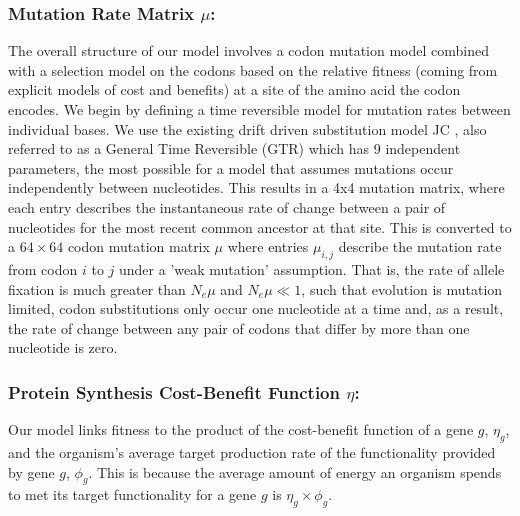 \documentclass{article}
\newcommand{\Nemu}{\ensuremath{{N_e \mu}}\xspace} %
\newcommand{\etag}{\ensuremath{\eta_g}\xspace}
\newcommand{\muij}{\ensuremath{\mu_{i,j}}\xspace}
\newcommand{\phig}{\ensuremath{\phi_{g}}\xspace}
\begin{document}
\subsubsection*{Mutation Rate Matrix $\mu$: }
The overall structure of our model involves a codon mutation model combined with a selection model on the codons based on the relative fitness (coming from explicit models of cost and benefits) at a site of the amino acid the codon encodes.
We begin by defining a time reversible model for mutation rates between individual bases.
We use the existing drift driven substitution model JC \citet{JukesAndCantor1969}, also referred to as a General Time Reversible (GTR) \citet{Tavare1986,Yang2014} which has 9 independent parameters, the most possible for a model that assumes mutations occur independently between nucleotides.
This results in a 4x4 mutation matrix, where each entry describes the instantaneous rate of change between a pair of nucleotides for the most recent common ancestor at that site.
This is converted to a $64 \times 64$ codon mutation matrix $\mu$ where entries $\muij$ describe the mutation rate from codon $i$ to $j$ under a 'weak mutation' assumption.
That is, the rate of allele fixation is much greater than \Nemu and $\Nemu \ll 1$, such that evolution is mutation limited, codon substitutions only occur one nucleotide at a time and, as a result,  the rate of change between any pair of codons that differ by more than one nucleotide is zero.

\subsubsection*{Protein Synthesis Cost-Benefit Function $\eta$: }
Our model links fitness to the product of the cost-benefit function of a gene $g$, $\etag$, and the organism's average target production rate of the functionality provided by gene $g$, $\phig$.
This is because the average amount of energy an organism spends to met its target functionality for a gene $g$ is $\etag \times \phig$.
 
\end{document}
